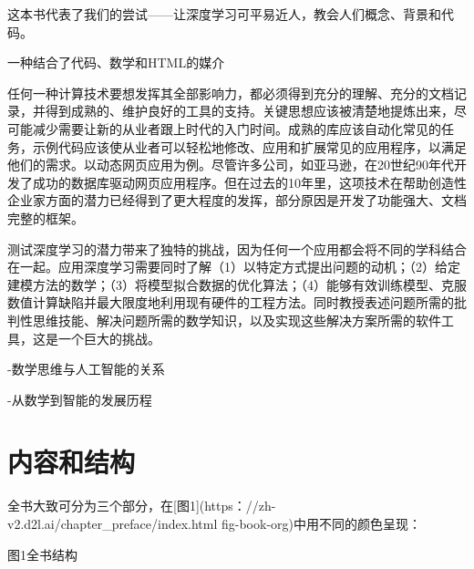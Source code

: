 这本书代表了我们的尝试——让深度学习可平易近人，教会人们概念、背景和代码。

一种结合了代码、数学和HTML的媒介

任何一种计算技术要想发挥其全部影响力，都必须得到充分的理解、充分的文档记录，并得到成熟的、维护良好的工具的支持。关键思想应该被清楚地提炼出来，尽可能减少需要让新的从业者跟上时代的入门时间。成熟的库应该自动化常见的任务，示例代码应该使从业者可以轻松地修改、应用和扩展常见的应用程序，以满足他们的需求。以动态网页应用为例。尽管许多公司，如亚马逊，在20世纪90年代开发了成功的数据库驱动网页应用程序。但在过去的10年里，这项技术在帮助创造性企业家方面的潜力已经得到了更大程度的发挥，部分原因是开发了功能强大、文档完整的框架。

测试深度学习的潜力带来了独特的挑战，因为任何一个应用都会将不同的学科结合在一起。应用深度学习需要同时了解（1）以特定方式提出问题的动机；（2）给定建模方法的数学；（3）将模型拟合数据的优化算法；（4）能够有效训练模型、克服数值计算缺陷并最大限度地利用现有硬件的工程方法。同时教授表述问题所需的批判性思维技能、解决问题所需的数学知识，以及实现这些解决方案所需的软件工具，这是一个巨大的挑战。


-数学思维与人工智能的关系

-从数学到智能的发展历程

\section{内容和结构}

全书大致可分为三个部分，在[图1](https：//zh-v2.d2l.ai/chapter\_preface/index.html fig-book-org)中用不同的颜色呈现：


图1全书结构

